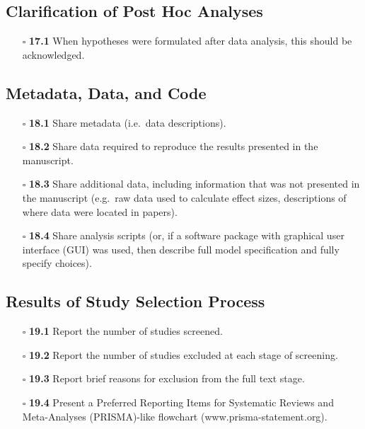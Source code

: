 \documentclass[11pt]{article}
\def\tightlist{}
\begin{document}
\begin{Form}
\subsection{Clarification of Post Hoc
Analyses}\label{clarification-of-post-hoc-analyses}

\begin{itemize}
\tightlist
\item[$\square$]
  \textbf{17.1} When hypotheses were formulated after data analysis,
  this should be acknowledged.
\end{itemize}

\subsection{Metadata, Data, and Code}\label{metadata-data-and-code}

\begin{itemize}
\tightlist
\item[$\square$]
  \textbf{18.1} Share metadata (i.e.~data descriptions).
\item[$\square$]
  \textbf{18.2} Share data required to reproduce the results presented
  in the manuscript.
\item[$\square$]
  \textbf{18.3} Share additional data, including information that was
  not presented in the manuscript (e.g.~raw data used to calculate
  effect sizes, descriptions of where data were located in papers).
\item[$\square$]
  \textbf{18.4} Share analysis scripts (or, if a software package with
  graphical user interface (GUI) was used, then describe full model
  specification and fully specify choices).
\end{itemize}

\subsection{Results of Study Selection
Process}\label{results-of-study-selection-process}

\begin{itemize}
\tightlist
\item[$\square$]
  \textbf{19.1} Report the number of studies screened.
\item[$\square$]
  \textbf{19.2} Report the number of studies excluded at each stage of
  screening.
\item[$\square$]
  \textbf{19.3} Report brief reasons for exclusion from the full text
  stage.
\item[$\square$]
  \textbf{19.4} Present a Preferred Reporting Items for Systematic
  Reviews and Meta-Analyses (PRISMA)-like flowchart
  (www.prisma-statement.org).
\end{itemize}


\end{Form}
\end{document}
